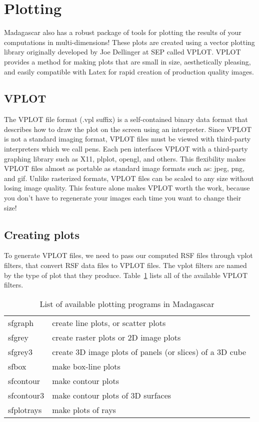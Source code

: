 \section{Plotting}

Madagascar also has a robust package of tools for plotting the results of your computations in multi-dimensions! These plots are created using a vector plotting library originally developed by Joe Dellinger at SEP called VPLOT. VPLOT provides a method for making plots that are small in size, aesthetically pleasing, and easily compatible with Latex for rapid creation of production quality images.

\subsection{VPLOT}
The VPLOT file format (.vpl suffix) is a self-contained binary data format that describes how to draw the plot on the screen using an interpreter. Since VPLOT is not a standard imaging format, VPLOT files must be viewed with third-party interpreters which we call pens. Each pen interfaces VPLOT with a third-party graphing library such as X11, plplot, opengl, and others. This flexibility makes VPLOT files almost as portable as standard image formats such as: jpeg, png, and gif. Unlike rasterized formats, VPLOT files can be scaled to any size without losing image quality. This feature alone makes VPLOT worth the work, because you don't have to regenerate your images each time you want to change their size!

\subsection{Creating plots}
To generate VPLOT files, we need to pass our computed RSF files through vplot filters, that convert RSF data files to VPLOT files. The vplot filters are named by the type of plot that they produce. Table~\ref{table:plotting} lists all of the available VPLOT filters.

\begin{table}
    \caption{List of available plotting programs in Madagascar}
    \label{table:plotting}
\begin{tabularx}{\textwidth}{|l|X| }
    \hline 
sfgraph & create line plots, or scatter plots \\
sfgrey & create raster plots or 2D image plots \\
sfgrey3 & create 3D image plots of panels (or slices) of a 3D cube \\
sfbox & make box-line plots \\
sfcontour & make contour plots \\
sfcontour3 & make contour plots of 3D surfaces \\
sfplotrays & make plots of rays \\
\hline 
\end{tabularx}
\end{table}

